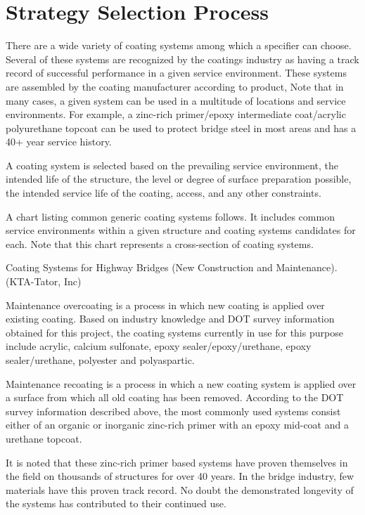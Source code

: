 \section{Strategy Selection Process}
There are a wide variety of coating systems among which a specifier can choose. Several of these systems are
recognized by the coatings industry as having a track record of successful performance in a given service
environment. These systems are assembled by the coating manufacturer according to product, Note that in many
cases, a given system can be used in a multitude of locations and service environments. For example, a zinc-rich
primer/epoxy intermediate coat/acrylic polyurethane topcoat can be used to protect bridge steel in most areas and has
a 40+ year service history.

A coating system is selected based on the prevailing service environment, the intended life of the structure, the
level or degree of surface preparation possible, the intended service life of the coating, access, and any other
constraints.

A chart listing common generic coating systems follows. It includes common service environments within a
given structure and coating systems candidates for each. Note that this chart represents a cross-section of coating
systems.

\begin{table}
  \caption{Coating Systems for Highway Bridges (New Construction and Maintenance). (KTA-Tator, Inc)}
  \label{tab:coating-system-highway-bridges}
\end{table}

Maintenance overcoating is a process in which new coating is applied over existing coating. Based on industry
knowledge and DOT survey information obtained for this project, the coating systems currently in use for this
purpose include acrylic, calcium sulfonate, epoxy sealer/epoxy/urethane, epoxy sealer/urethane, polyester and
polyaspartic.

Maintenance recoating is a process in which a new coating system is applied over a surface from which all old
coating has been removed. According to the DOT survey information described above, the most commonly used
systems consist either of an organic or inorganic zinc-rich primer with an epoxy mid-coat and a urethane topcoat.

It is noted that these zinc-rich primer based systems have proven themselves in the field on thousands of
structures for over 40 years. In the bridge industry, few materials have this proven track record. No doubt the
demonstrated longevity of the systems has contributed to their continued use.


